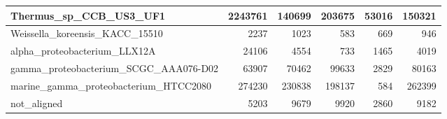 \documentclass[12pt,a4paper]{article}
\begin{document}
\begin{table}[ht]
\begin{center}
\begin{tabular}{|l*{5}{|r}|}
Thermus\_sp\_CCB\_US3\_UF1 & 2243761 & 140699 & 203675 & 53016 & 150321 \\ \hline
Weissella\_koreensis\_KACC\_15510 & 2237 & 1023 & 583 & 669 & 946 \\ \hline
alpha\_proteobacterium\_LLX12A & 24106 & 4554 & 733 & 1465 & 4019 \\ \hline
gamma\_proteobacterium\_SCGC\_AAA076-D02 & 63907 & 70462 & 99633 & 2829 & 80163 \\ \hline
marine\_gamma\_proteobacterium\_HTCC2080 & 274230 & 230838 & 198137 & 584 & 262399 \\ \hline
not\_aligned & 5203 & 9679 & 9920 & 2860 & 9182 \\ \hline
\end{tabular}
\end{center}
\end{table}
\end{document}
